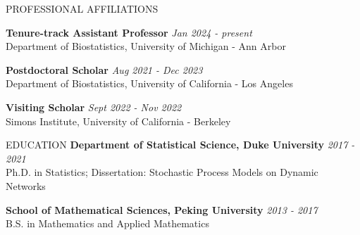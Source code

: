 \documentclass{resume} %
\begin{document}

\begin{rSection}{PROFESSIONAL AFFILIATIONS}
	
{\bf Tenure-track Assistant Professor} \hfill {\em Jan 2024  -  present} 
\\ {\small Department of Biostatistics, University of Michigan - Ann Arbor}
	
{\bf Postdoctoral Scholar} \hfill {\em Aug 2021 - Dec 2023} 
\\ {\small Department of Biostatistics, University of California - Los Angeles}

{\bf Visiting Scholar} \hfill {\em Sept 2022 - Nov 2022} 
\\ {\small Simons Institute, University of California - Berkeley}

%
\end{rSection}

\begin{rSection}{EDUCATION}
{\bf Department of Statistical Science, Duke University} \hfill {\em 2017 - 2021} 
\\ Ph.D. in Statistics; Dissertation: Stochastic Process Models on Dynamic Networks

{\bf School of Mathematical Sciences, Peking University} \hfill {\em 2013 - 2017} 
\\ B.S. in Mathematics and Applied Mathematics
\end{rSection}

%
%




\end{document}
